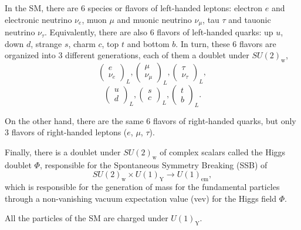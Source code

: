 In the SM, there are 6 species or flavors of left-handed leptons: electron $e$ and electronic neutrino $\nu_e$, muon $\mu$ and muonic neutrino $\nu_{\mu}$, tau $\tau$ and tauonic neutrino $\nu_{\tau}$. Equivalently, there are also 6 flavors of left-handed quarks: up $u$, down $d$, strange $s$, charm $c$, top $t$ and bottom $b$. In turn, these 6 flavors are organized into 3 different generations, each of them a doublet under $SU(2)_{\textrm{w}}$,
\begin{equation}
\begin{pmatrix}
e\\ 
\nu_e
\end{pmatrix}_L,
\begin{pmatrix}
\mu\\ 
\nu_{\mu}
\end{pmatrix}_L,
\begin{pmatrix}
\tau\\ 
\nu_{\tau}
\end{pmatrix}_L,
\end{equation}
\begin{equation}
\begin{pmatrix}
u\\ 
d
\end{pmatrix}_L,
\begin{pmatrix}
s\\ 
c
\end{pmatrix}_L,
\begin{pmatrix}
t\\ 
b
\end{pmatrix}_L.
\end{equation}

On the other hand, there are the same 6 flavors of right-handed quarks, but only 3 flavors of right-handed leptons ($e$, $\mu$, $\tau$). 

Finally, there is a doublet under $SU(2)_{\textrm{w}}$ of complex scalars called the Higgs doublet $\Phi$, responsible for the Spontaneous Symmetry Breaking (SSB) of
\begin{equation}
SU(2)_{\textrm{w}}\times U(1)_{\textrm{Y}}\to U(1)_{\textrm{em}},
\end{equation}
which is responsible for the generation of mass for the fundamental particles through a non-vanishing vacuum expectation value (vev) for the Higgs field $\Phi$. 

All the particles of the SM are charged under $U(1)_{\textrm{Y}}$. 

